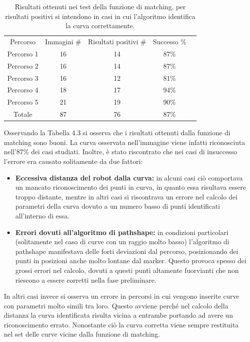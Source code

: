     \begin{table}[hb]
        \centering
        \begin{tabular}{ccccc}
            Percorso & Immagini \# & Risultati positivi \# & Successo \% \\
            Percorso 1 & 16 & 14 & 87\% \\
            Percorso 2 & 16 & 14 & 87\% \\
            Percorso 3 & 16 & 12 & 81\% \\
            Percorso 4 & 18 & 17 & 94\% \\
            Percorso 5 & 21 & 19 & 90\% \\
            Totale & 87 &    76 &    87\% \\
        \end{tabular}
        \caption{Risultati ottenuti nei test della funzione di matching, per risultati positivi si intendono in casi in cui l'algoritmo identifica la curva correttamente.}
    \end{table}

    Osservando la Tabella 4.3 si osserva che i risultati ottenuti dalla funzione di matching sono buoni. La curva osservata nell'immagine viene infatti riconosciuta nell'87\% dei casi studiati. Inoltre, è stato riscontrato che nei casi di insuccesso l'errore era causato solitamente da due fattori:
    \begin{itemize}
        \item \textbf{Eccessiva distanza del robot dalla curva:} in alcuni casi ciò comportava un mancato riconoscimento dei punti in curva, in quanto essa risultava essere troppo distante, mentre in altri casi si riscontrava un errore nel calcolo dei parametri della curva dovuto a un numero basso di punti identificati all'interno di essa.
        \item \textbf{Errori dovuti all'algoritmo di pathshape:} in condizioni particolari (solitamente nel caso di curve con un raggio molto basso) l'algoritmo di pathshape manifestava delle forti deviazioni dal percorso, posizionando dei punti in posizioni anche molto lontane dal marker. Questo provoca spesso dei grossi errori nel calcolo, dovuti a questi punti altamente fuorvianti che non riescono a essere corretti nella fase preliminare.
    \end{itemize}
    In altri casi invece si osserva un errore in percorsi in cui vengono inserite curve con parametri molto simili tra loro. Questo avviene perché nel calcolo della distanza la curva identificata risulta vicina a entrambe portando ad avere un riconoscimento errato. Nonostante ciò la curva corretta viene sempre restituita nel set delle curve vicine dalla funzione di matching.

